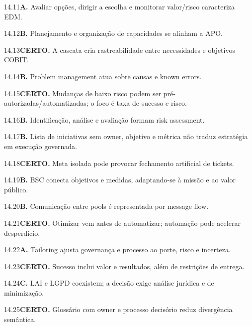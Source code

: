 \begin{solucao}{14.11}\textbf{A.} Avaliar opções, dirigir a escolha e monitorar valor/risco caracteriza EDM.\end{solucao}
\begin{solucao}{14.12}\textbf{B.} Planejamento e organização de capacidades se alinham a APO.\end{solucao}
\begin{solucao}{14.13}\textbf{CERTO.} A cascata cria rastreabilidade entre necessidades e objetivos COBIT.\end{solucao}
\begin{solucao}{14.14}\textbf{B.} Problem management atua sobre causas e known errors.\end{solucao}
\begin{solucao}{14.15}\textbf{CERTO.} Mudanças de baixo risco podem ser pré-autorizadas/automatizadas; o foco é taxa de sucesso e risco.\end{solucao}
\begin{solucao}{14.16}\textbf{B.} Identificação, análise e avaliação formam risk assessment.\end{solucao}
\begin{solucao}{14.17}\textbf{B.} Lista de iniciativas sem owner, objetivo e métrica não traduz estratégia em execução governada.\end{solucao}
\begin{solucao}{14.18}\textbf{CERTO.} Meta isolada pode provocar fechamento artificial de tickets.\end{solucao}
\begin{solucao}{14.19}\textbf{B.} BSC conecta objetivos e medidas, adaptando-se à missão e ao valor público.\end{solucao}
\begin{solucao}{14.20}\textbf{B.} Comunicação entre pools é representada por message flow.\end{solucao}
\begin{solucao}{14.21}\textbf{CERTO.} Otimizar vem antes de automatizar; automação pode acelerar desperdício.\end{solucao}
\begin{solucao}{14.22}\textbf{A.} Tailoring ajusta governança e processo ao porte, risco e incerteza.\end{solucao}
\begin{solucao}{14.23}\textbf{CERTO.} Sucesso inclui valor e resultados, além de restrições de entrega.\end{solucao}
\begin{solucao}{14.24}\textbf{C.} LAI e LGPD coexistem; a decisão exige análise jurídica e de minimização.\end{solucao}
\begin{solucao}{14.25}\textbf{CERTO.} Glossário com owner e processo decisório reduz divergência semântica.\end{solucao}

